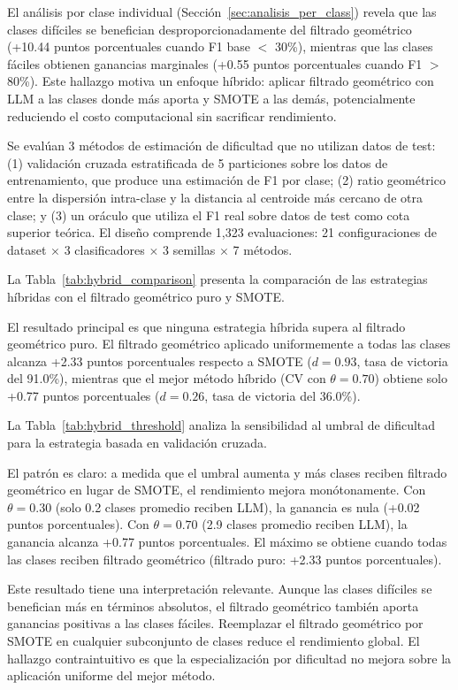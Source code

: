 El análisis por clase individual (Sección~\ref{sec:analisis_per_class}) revela que las clases difíciles se benefician desproporcionadamente del filtrado geométrico (+10.44 puntos porcentuales cuando F1 base $<$ 30\%), mientras que las clases fáciles obtienen ganancias marginales (+0.55 puntos porcentuales cuando F1 $>$ 80\%). Este hallazgo motiva un enfoque híbrido: aplicar filtrado geométrico con LLM a las clases donde más aporta y SMOTE a las demás, potencialmente reduciendo el costo computacional sin sacrificar rendimiento.

Se evalúan 3 métodos de estimación de dificultad que no utilizan datos de test: (1) validación cruzada estratificada de 5 particiones sobre los datos de entrenamiento, que produce una estimación de F1 por clase; (2) ratio geométrico entre la dispersión intra-clase y la distancia al centroide más cercano de otra clase; y (3) un oráculo que utiliza el F1 real sobre datos de test como cota superior teórica. El diseño comprende 1,323 evaluaciones: 21 configuraciones de dataset $\times$ 3 clasificadores $\times$ 3 semillas $\times$ 7 métodos.

La Tabla~\ref{tab:hybrid_comparison} presenta la comparación de las estrategias híbridas con el filtrado geométrico puro y SMOTE.



El resultado principal es que ninguna estrategia híbrida supera al filtrado geométrico puro. El filtrado geométrico aplicado uniformemente a todas las clases alcanza +2.33 puntos porcentuales respecto a SMOTE ($d = 0.93$, tasa de victoria del 91.0\%), mientras que el mejor método híbrido (CV con $\theta = 0.70$) obtiene solo +0.77 puntos porcentuales ($d = 0.26$, tasa de victoria del 36.0\%).

La Tabla~\ref{tab:hybrid_threshold} analiza la sensibilidad al umbral de dificultad para la estrategia basada en validación cruzada.



El patrón es claro: a medida que el umbral aumenta y más clases reciben filtrado geométrico en lugar de SMOTE, el rendimiento mejora monótonamente. Con $\theta = 0.30$ (solo 0.2 clases promedio reciben LLM), la ganancia es nula (+0.02 puntos porcentuales). Con $\theta = 0.70$ (2.9 clases promedio reciben LLM), la ganancia alcanza +0.77 puntos porcentuales. El máximo se obtiene cuando todas las clases reciben filtrado geométrico (filtrado puro: +2.33 puntos porcentuales).

Este resultado tiene una interpretación relevante. Aunque las clases difíciles se benefician más en términos absolutos, el filtrado geométrico también aporta ganancias positivas a las clases fáciles. Reemplazar el filtrado geométrico por SMOTE en cualquier subconjunto de clases reduce el rendimiento global. El hallazgo contraintuitivo es que la especialización por dificultad no mejora sobre la aplicación uniforme del mejor método.
